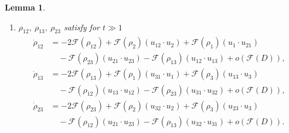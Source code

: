 \documentclass[reqno]{amsart}
\theoremstyle{plain}
\newtheorem{lemma}[theorem]{Lemma}
\theoremstyle{definition}
\numberwithin{equation}{section}
\newcommand{\1}{\mathbbm{1}}
\begin{document}
\begin{lemma}
\begin{enumerate}
\item $\rho_{12},\ \rho_{13},\ \rho_{23}$ satisfy for $t\gg 1$
\begin{align}\label{rhojkes1}
\begin{aligned}
\dot{\rho}_{12}&=-2\mathcal{F}(\rho_{12})+\mathcal{F}(\rho_2)(u_{12}\cdot u_2)+\mathcal{F}(\rho_1)(u_1\cdot u_{21})
\\
&\quad -\mathcal{F}(\rho_{23})(u_{21}\cdot u_{23})-\mathcal{F}(\rho_{13})(u_{12}\cdot u_{13})+o\left(\mathcal{F}(D)\right),
\\
\dot{\rho}_{13}&=-2\mathcal{F}(\rho_{13})+\mathcal{F}(\rho_1)(u_{31}\cdot u_1)+\mathcal{F}(\rho_3)(u_{13}\cdot u_3)
\\
&\quad-\mathcal{F}(\rho_{12})(u_{13}\cdot u_{12})-\mathcal{F}(\rho_{23})(u_{31}\cdot u_{32})+o\left(\mathcal{F}(D)\right),
\\
\dot{\rho}_{23}&=-2\mathcal{F}(\rho_{23})+\mathcal{F}(\rho_2)(u_{32}\cdot u_2)+\mathcal{F}(\rho_3)(u_{23}\cdot u_3)
\\
&\quad-\mathcal{F}(\rho_{12})(u_{21}\cdot u_{23})-\mathcal{F}(\rho_{13})(u_{32}\cdot u_{31})+o\left(\mathcal{F}(D)\right).
\end{aligned}
\end{align}
\end{enumerate}
\end{lemma}
\end{document}
